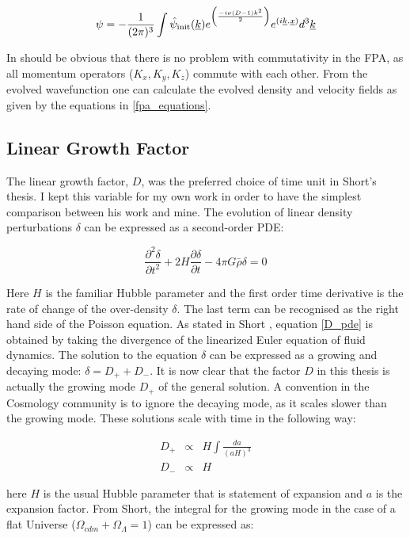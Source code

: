 \begin{equation}
\label{fpa_evolve}
\psi = -\frac{1}{(2\pi)^3} \int \hat{\psi}_{\rm init}(\underline{k}) e^{ \left(\frac{-i\nu(D-1)k^2}{2}\right)} e^{(i\underline{k}.\underline{x})}d^3\underline{k}
\end{equation}

\noindent In should be obvious that there is no problem with commutativity in the FPA, as all momentum operators ($K_x, K_y, K_z$) commute with each other. From the evolved wavefunction one can calculate the evolved density and velocity fields as given by the equations in \ref{fpa_equations}.

\subsection{Linear Growth Factor}
\label{lingrow}
The linear growth factor, $D$, was the preferred choice of time unit in Short's thesis. I kept this variable for my own work in order to have the simplest comparison between his work and mine. The evolution of linear density perturbations $\delta$ can be expressed as a second-order PDE:

\begin{equation}
\label{D_pde}
\frac{\partial^2\delta}{\partial t^2} + 2H\frac{\partial\delta}{\partial t} - 4\pi G\bar{\rho}\delta = 0
\end{equation}

\noindent Here $H$ is the familiar Hubble parameter and the first order time derivative is the rate of change of the over-density $\delta$. The last term can be recognised as the right hand side of the Poisson equation. As stated in Short \citep{bib_short}, equation \ref{D_pde} is obtained by taking the divergence of the linearized Euler equation of fluid dynamics. The solution to the equation $\delta$ can be expressed as a growing and decaying mode: $\delta = D_+ + D_-$. It is now clear that the factor $D$ in this thesis is actually the growing mode $D_+$ of the general solution. A convention in the Cosmology community is to ignore the decaying mode, as it scales slower than the growing mode. These solutions scale with time in the following way:

\begin{eqnarray}
D_+ &\propto& H \int \frac{da}{(aH)^3}\\
D_- &\propto& H
\end{eqnarray}

\noindent here $H$ is the usual Hubble parameter that is statement of expansion and $a$ is the expansion factor. From Short, the integral for the growing mode in the case of a flat Universe ($\Omega_{cdm} + \Omega_{\Lambda} = 1$) can be expressed as:

